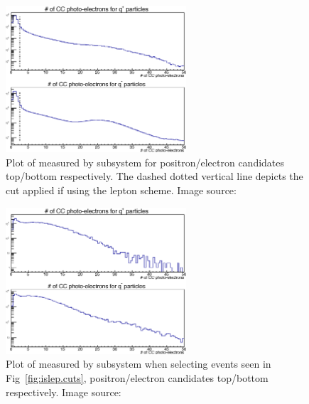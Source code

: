 %
\begin{figure}\begin{center}
\includegraphics[width=0.6\textwidth]{figures/lepton/CC_nPE.eps}
\caption[Number of Photo-electrons Measured by  for All e$^-$ and e$^+$ Candidates]{\label{fig:islep.CC}Plot of  measured by   subsystem for positron/electron candidates top/bottom respectively. The dashed dotted vertical line depicts the cut applied if using the  lepton  scheme. Image source:~\cite{clas.thesis.kunkel}}
\end{center}\end{figure}

\begin{figure}\begin{center}
\includegraphics[width=0.6\textwidth]{figures/lepton/CC_NPEcut.eps}
\caption[Number of Photo-electrons Measured by  for \π[0] Events]{\label{fig:islep.CC1}Plot of  measured by   subsystem when selecting \π[0] events seen in Fig~\ref{fig:islep.cuts}, positron/electron candidates top/bottom respectively. Image source:~\cite{clas.thesis.kunkel}}
\end{center}\end{figure}

